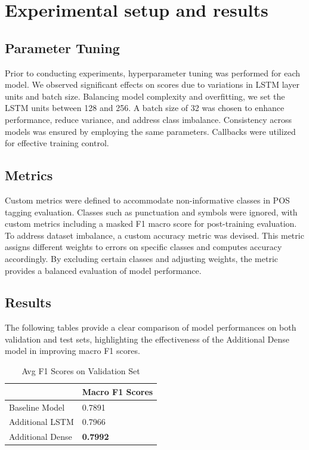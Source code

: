 \documentclass[11pt]{article}
\begin{document}
\section{Experimental setup and results}
\label{sec:results}

\subsection{Parameter Tuning}
Prior to conducting experiments, hyperparameter tuning was performed for each model. We observed significant effects on scores due to variations in LSTM layer units and batch size. Balancing model complexity and overfitting, we set the LSTM units between 128 and 256. A batch size of 32 was chosen to enhance performance, reduce variance, and address class imbalance. Consistency across models was ensured by employing the same parameters.
Callbacks were utilized for effective training control.
\subsection{Metrics}
Custom metrics were defined to accommodate non-informative classes in POS tagging evaluation. Classes such as punctuation and symbols were ignored, with custom metrics including a masked F1 macro score for post-training evaluation.
\\To address dataset imbalance, a custom accuracy metric was devised. This metric assigns different weights to errors on specific classes and computes accuracy accordingly. By excluding certain classes and adjusting weights, the metric provides a balanced evaluation of model performance.
\subsection{Results}
The following tables provide a clear comparison of model performances on both validation and test sets, highlighting the effectiveness of the Additional Dense model in improving macro F1 scores.
\begin{table}[ht]
\caption{Avg F1 Scores on Validation Set}
\centering
\begin{tabular}{|l|l|}
\hline
  & Macro F1 Scores \\ \hline
Baseline Model                     & 0.7891                   \\ \hline
Additional LSTM                    & 0.7966                   \\ \hline
Additional Dense                  & \textbf{0.7992}                   \\ \hline
\end{tabular}
\label{Tab:Tcr_1}
\end{table}
\end{document}
